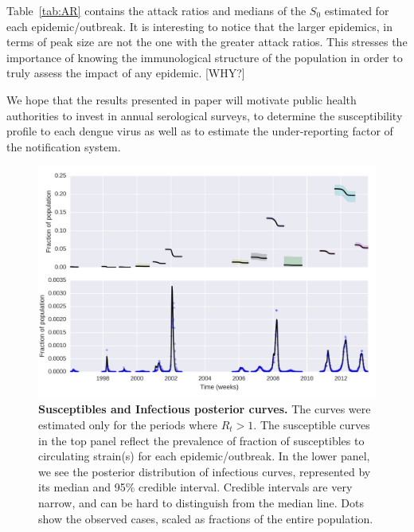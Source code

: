 \documentclass[10pt]{article}
\begin{document}
Table~\ref{tab:AR} contains the attack ratios and medians of the $S_0$ 
estimated for each epidemic/outbreak.
It is interesting to notice that the larger epidemics, in terms of peak size are 
not the one with the greater attack ratios.
This stresses the importance of knowing the immunological structure of the 
population in order to truly assess the impact of any epidemic. [WHY?]

We hope that the results presented in paper will motivate public 
health authorities to invest in annual serological surveys, to determine the 
susceptibility profile to each dengue virus as well as to estimate the 
under-reporting factor of the notification system.

\begin{figure}[!ht]
\begin{center}
\includegraphics[width=\textwidth]{plots/concat_SI.png}
\end{center}
\caption{
{\bf Susceptibles and Infectious posterior curves.}  The curves were estimated 
only for the periods where $R_t> 1$.  The susceptible curves in the top panel 
reflect the prevalence of fraction of susceptibles to circulating strain(s) for 
each epidemic/outbreak.
In the lower panel, we see the posterior distribution 
of infectious curves, represented by its median and 95\% credible interval.
Credible intervals are very narrow, and can be hard to distinguish from the 
median line. 
Dots show the observed cases, scaled as fractions of the entire 
population.
}
\label{Fig:S0}
\end{figure}
\end{document}

